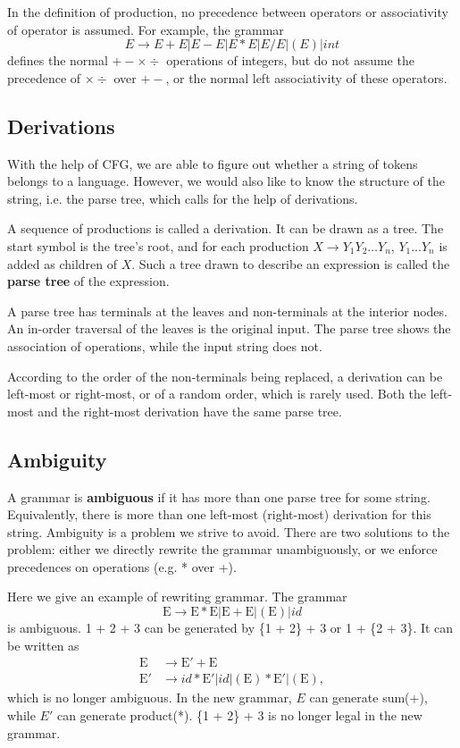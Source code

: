 In the definition of production,  no precedence between operators or associativity of operator is assumed. For example, the grammar 
\begin{equation}\label{intops}
E\rightarrow E + E | E - E | E * E | E/E | (E) | int
\end{equation}
defines the normal $+-\times \div$ operations of integers, but do not assume the precedence of $\times \div$ over $+-$, or the normal left associativity of these operators.
\subsection{Derivations}
With the help of CFG, we are able to figure out whether a string of tokens belongs to a language. However, we would also like to know the structure of the string, i.e. the parse tree, which calls for the help of derivations.

A sequence of productions is called a derivation. It can be drawn as a tree. The start symbol is the tree's root, and for each production $X\rightarrow Y_1Y_2\dots Y_n$, $Y_1\dots Y_n$ is added as children of $X$. Such a tree drawn to describe an expression is called the {\bf parse tree} of the expression.

A parse tree has terminals at the leaves and non-terminals at the interior nodes. An in-order traversal of the leaves is the original input. The parse tree shows the association of operations, while the input string does not.

According to the order of the non-terminals being replaced, a derivation can be left-most or right-most, or of a random order, which is rarely used. Both the left-most and the right-most derivation have the same parse tree.
\subsection{Ambiguity}
A grammar is {\bf ambiguous} if it has more than one parse tree for some string. Equivalently, there is more than one left-most (right-most) derivation for this string. Ambiguity is a problem we strive to avoid. There are two solutions to the problem: either we directly rewrite the grammar unambiguously, or we enforce precedences on operations (e.g. * over +).

Here we give an example of rewriting grammar. The grammar
\begin{equation*}
\text{E}\rightarrow \text{E}*\text{E} | \text{E}+\text{E} | (\text{E}) | id
\end{equation*}
is ambiguous. 1 + 2 + 3 can be generated by \{1 + 2\} + 3 or 1 + \{2 + 3\}. It can be written as 
\begin{equation*}
\begin{split}
\text{E}&\rightarrow \text{E}' + \text{E}\\
\text{E}'&\rightarrow id * \text{E}' | id | (\text{E}) * \text{E}' | (\text{E}),
\end{split}
\end{equation*}
which is no longer ambiguous. In the new grammar, $E$ can generate sum(+), while $E'$ can generate product(*). \{1 + 2\} + 3 is no longer legal in the new grammar.

